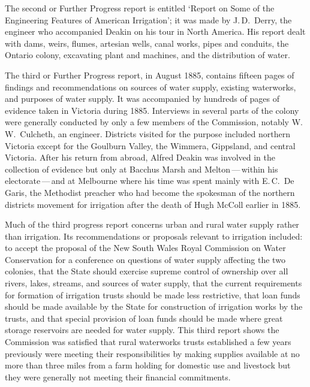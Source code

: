The second or Further Progress report is entitled `Report on Some of
the Engineering Features of American Irrigation'; it was made by
J.\,D.~Derry,  the engineer who accompanied
Deakin on his tour in North America.  His report dealt with dams,
weirs, flumes, artesian wells, canal works, pipes and conduits, the
Ontario  colony, excavating plant and machines, and the
distribution of water.

The third or Further Progress report, in August 1885, contains fifteen
pages of findings and recommendations on sources of water supply,
existing waterworks, and purposes of water supply.  It was accompanied
by hundreds of pages of evidence taken in Victoria during 1885.
Interviews in several parts of the colony were generally conducted by
only a few members of the Commission, notably W.\,W.~Culcheth,
 an
engineer.  Districts visited for the purpose included northern
Victoria except for the Goulburn Valley,  the
Wimmera,  Gippsland,  and
central Victoria.  After his return from abroad, Alfred Deakin was
involved in the collection of evidence but only at Bacchus Marsh
 and  
Melton\,---\,within his electorate\,---\,and at Melbourne where his
time was spent mainly with E.\,C.~De Garis, 
the Methodist preacher who had become the spokesman of the northern
districts movement for irrigation after the death of Hugh McColl
earlier in 1885.

Much of the third progress report concerns urban and rural water
supply rather than irrigation.  Its recommendations or proposals
relevant to irrigation included: to accept the proposal of the New
South Wales Royal Commission on Water Conservation  for a conference on questions of water supply affecting the
two colonies, that the State should exercise supreme control of
ownership over all rivers, lakes, streams, and sources of water
supply, that the current requirements for formation of irrigation
trusts should be made less restrictive, that loan funds should be made
available by the State for construction of irrigation works by the
trusts, and that special provision of loan funds should be made where
great storage reservoirs are needed for water supply.  This third
report shows the Commission was satisfied that rural waterworks trusts
 established a few years previously were
meeting their responsibilities by making supplies available at no more
than three miles from a farm holding for domestic use and livestock
but they were generally not meeting their financial commitments.

